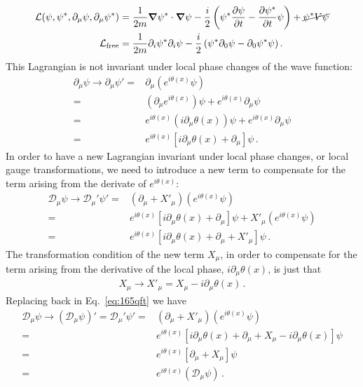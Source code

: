 \begin{align}
  \mathcal{L}(\psi,\psi^*,\partial_\mu\psi,\partial_\mu\psi^*)&=\frac{1}{2m}\boldsymbol{\nabla}\psi^*\cdot\boldsymbol{\nabla}\psi-\frac{i}{2}
  \left(
\psi^*\frac{\partial\psi}{\partial t}-\frac{\partial\psi^*}{\partial t}\psi
  \right)+\cancel{\psi^*V\psi}\\
\mathcal{L}_{\text{free}}&=\frac{1}{2m}\partial_i\psi^*\partial_i\psi-\frac{i}{2}
  \left(\psi^*\partial_0\psi-\partial_0\psi^*\psi\right).\nonumber
\end{align}
This Lagrangian is not invariant under local phase changes of the wave function: 
\begin{align}
  \partial_\mu \psi\to\partial_\mu \psi'=&\partial_\mu \left(e^{i\theta(x)}\psi\right)\nonumber\\
  =&\left(\partial_\mu e^{i\theta(x)}\right)\psi+e^{i\theta(x)}\partial_\mu\psi\nonumber\\
  =&e^{i\theta(x)}\left(i\partial_\mu \theta(x)\right)\psi+e^{i\theta(x)}\partial_\mu\psi\nonumber\\
  =&e^{i\theta(x)}\left[i\partial_\mu \theta(x)+\partial_\mu\right]\psi\,.
\end{align}
In order to have a new Lagrangian invariant under local phase changes, or local gauge transformations, we need to introduce a new term to compensate for the term arising from the derivate of $e^{i\theta(x)}$:
\begin{align}
\label{eq:165qft}
   \mathcal{D}_\mu \psi\to\mathcal{D}_\mu' \psi'=&(\partial_\mu+X'_\mu) \left(e^{i\theta(x)}\psi\right)\nonumber\\
   =&e^{i\theta(x)}\left[i\partial_\mu \theta(x)+\partial_\mu\right]\psi+X'_\mu \left(e^{i\theta(x)}\psi\right)\nonumber\\
   =&e^{i\theta(x)}\left[i\partial_\mu \theta(x)+\partial_\mu+X'_\mu \right]\psi\,.
\end{align}
The transformation condition of the new term $X_\mu$, in order to compensate for the term arising from the derivative of the local phase, $i\partial_\mu\theta(x)$, is just that
\begin{align}
\label{eq:169qft}
X_\mu\to  X'_\mu=X_\mu-i\partial_\mu\theta(x)\,.
\end{align}
Replacing back in Eq.~\eqref{eq:165qft} we have
\begin{align}
    \mathcal{D}_\mu \psi\to\left(\mathcal{D}_\mu \psi\right)'=\mathcal{D}_\mu' \psi'=&(\partial_\mu+X'_\mu) \left(e^{i\theta(x)}\psi\right)\nonumber\\
=&e^{i\theta(x)}\left[i\partial_\mu \theta(x)+\partial_\mu+X_\mu-i\partial_\mu\theta(x) \right]\psi\nonumber\\
=&e^{i\theta(x)}\left[\partial_\mu+X_\mu\right]\psi\nonumber\\
=&e^{i\theta(x)}\left(\mathcal{D}_\mu\psi\right)\,.
\end{align}
